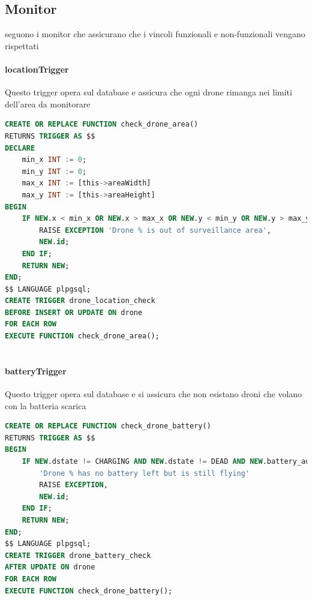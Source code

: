 \documentclass[a4paper, 11pt]{article}
\begin{document}
\subsection{Monitor}
seguono i monitor che assicurano che i vincoli funzionali e non-funzionali vengano rispettati
\paragraph*{locationTrigger}
Questo trigger opera sul database e assicura che ogni drone rimanga nei limiti dell'area da monitorare 
\begin{lstlisting}[language=SQL, caption={locationTrigger}]
CREATE OR REPLACE FUNCTION check_drone_area()
RETURNS TRIGGER AS $$
DECLARE
    min_x INT := 0;
    min_y INT := 0;
    max_x INT := [this->areaWidth] 
    max_y INT := [this->areaHeight]
BEGIN
    IF NEW.x < min_x OR NEW.x > max_x OR NEW.y < min_y OR NEW.y > max_y THEN
        RAISE EXCEPTION 'Drone % is out of surveillance area',
        NEW.id;
    END IF;
    RETURN NEW;
END;
$$ LANGUAGE plpgsql;
CREATE TRIGGER drone_location_check
BEFORE INSERT OR UPDATE ON drone
FOR EACH ROW
EXECUTE FUNCTION check_drone_area();
        

\end{lstlisting}
\paragraph*{batteryTrigger}
Questo trigger opera sul database e si assicura che non esistano droni che volano con la batteria scarica
    \begin{lstlisting}[language=SQL, caption={batteryTrigger}]
CREATE OR REPLACE FUNCTION check_drone_battery()
RETURNS TRIGGER AS $$
BEGIN
    IF NEW.dstate != CHARGING AND NEW.dstate != DEAD AND NEW.battery_autonomy <= 0 THEN
        'Drone % has no battery left but is still flying'
        RAISE EXCEPTION, 
        NEW.id;
    END IF;
    RETURN NEW;
END;
$$ LANGUAGE plpgsql;
CREATE TRIGGER drone_battery_check
AFTER UPDATE ON drone
FOR EACH ROW
EXECUTE FUNCTION check_drone_battery();
 
\end{lstlisting}
\newpage
\end{document}
